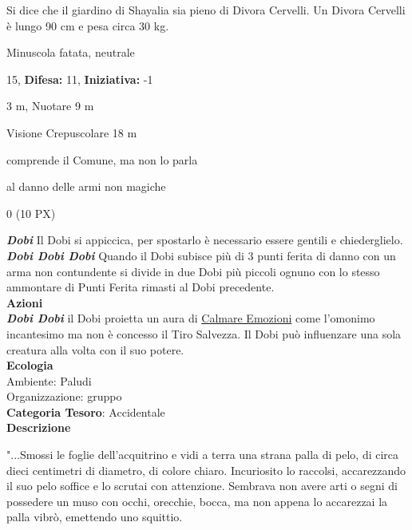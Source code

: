 \begin{multicols}{2}
{Si dice che il giardino di Shayalia sia pieno di Divora Cervelli. Un Divora Cervelli è lungo 90 cm e pesa circa 30 kg.

\noindent
\begin{description}[noitemsep, topsep=0pt, parsep=0pt, partopsep=0pt, leftmargin=0cm, labelwidth=2.2cm]
	\item[\textbf{Taglia/Tipo:}] Minuscola fatata, neutrale
	\item[\textbf{Caratt.:}] 
	\item[\textbf{Punti Ferita:}] 15,  \textbf{Difesa:} 11,  \textbf{Iniziativa:} -1
	\item[\textbf{Movimento:}] 3 m, Nuotare 9 m
	\item[\textbf{Tiri Salvez.:}] 
	\item[\textbf{Sensi:}] Visione Crepuscolare 18 m
	\item[\textbf{Linguaggi:}] comprende il Comune, ma non lo parla
	\item[\textbf{Imm. Danni:}] al danno delle armi non magiche
	\item[\textbf{Sfida:}] 0 (10 PX)\smallskip
\end{description}

\emph{\textbf{Dobi}} Il Dobi si appiccica, per spostarlo è necessario essere gentili e chiederglielo.\\
\emph{\textbf{Dobi Dobi Dobi}} Quando il Dobi subisce più di 3 punti ferita di danno con un arma non contundente si divide in due Dobi più piccoli ognuno con lo stesso ammontare di Punti Ferita rimasti al Dobi precedente.\\
\smallskip\textbf{Azioni}\\
\emph{\textbf{Dobi Dobi}} il Dobi proietta un aura di \hyperlink{Calmare Emozioni}{Calmare Emozioni} come l'omonimo incantesimo ma non è concesso il Tiro Salvezza. Il Dobi può influenzare una sola creatura alla volta con il suo potere.\\
\textbf{Ecologia}\\
Ambiente: Paludi\\
Organizzazione: gruppo\\
\textbf{Categoria Tesoro}: Accidentale\\
\textbf{Descrizione}\\
{\small "...Smossi le foglie dell'acquitrino e vidi a terra una strana palla di pelo, di circa dieci centimetri di diametro, di colore chiaro. Incuriosito lo raccolsi, accarezzando il suo pelo soffice e lo scrutai con attenzione. Sembrava non avere arti o segni di possedere un muso con occhi, orecchie, bocca, ma non appena lo accarezzai la palla vibrò, emettendo uno squittio.

}}
\end{multicols}
